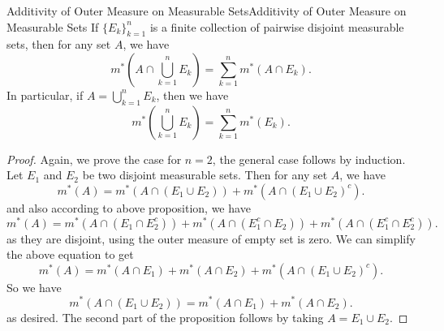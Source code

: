 \documentclass[../main.tex]{subfiles}
\begin{document}
\begin{proposition}{Additivity of Outer Measure on Measurable Sets}{Additivity of Outer Measure on Measurable Sets}
  If $\{E_k\}_{k=1}^{n}$ is a finite collection of pairwise disjoint measurable sets, then for any set $A$, we have
  \begin{equation}
    m^*\left(A \cap \bigcup_{k=1}^{n} E_k\right) = \sum_{k=1}^{n} m^*(A \cap E_k).
  \end{equation}
  In particular, if $A = \bigcup_{k=1}^{n} E_k$, then we have
  \begin{equation}
    m^*\left(\bigcup_{k=1}^{n} E_k\right) = \sum_{k=1}^{n} m^*(E_k).
  \end{equation}
\end{proposition}
\begin{proof}
  Again, we prove the case for $n = 2$, the general case follows by induction. Let $E_1$ and $E_2$ be two disjoint measurable sets. Then for any set $A$, we have
  \begin{equation*}
    m^*(A) = m^*(A \cap (E_1 \cup E_2)) + m^*(A \cap (E_1 \cup E_2)^c).
  \end{equation*}
  and also according to above proposition, we have
  \begin{equation*}
    m^*(A) = m^*(A \cap (E_1 \cap E_2^c)) + m^*(A \cap (E_1^c \cap E_2)) + m^*(A \cap (E_1^c \cap E_2^c)).
  \end{equation*}
  as they are disjoint, using the outer measure of empty set is zero. We can simplify the above equation to get
  \begin{equation*}
    m^*(A) = m^*(A \cap E_1) + m^*(A \cap E_2) + m^*(A \cap (E_1 \cup E_2)^c).
  \end{equation*}
  So we have
  \begin{equation*}
    m^*(A \cap (E_1 \cup E_2)) = m^*(A \cap E_1) + m^*(A \cap E_2).
  \end{equation*}
  as desired. The second part of the proposition follows by taking $A = E_1 \cup E_2$.
\end{proof}
\end{document}
